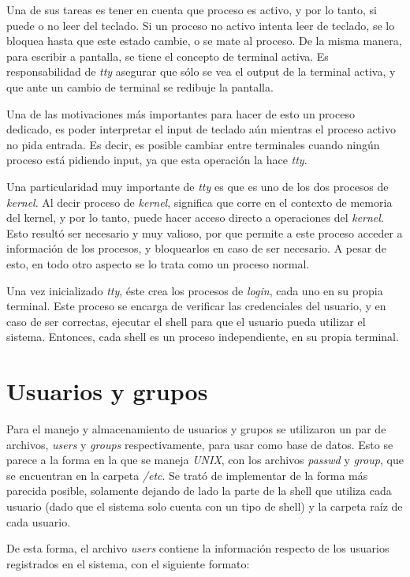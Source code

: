 \documentclass[a4paper,10pt]{article}
\begin{document}
Una de sus tareas es tener en cuenta que proceso es activo, y por lo tanto, si puede o no leer del teclado.
Si un proceso no activo intenta leer de teclado, se lo bloquea hasta que este estado cambie, o se mate al proceso.
De la misma manera, para escribir a pantalla, se tiene el concepto de terminal activa.
Es responsabilidad de \textit{tty} asegurar que sólo se vea el output de la terminal activa, y que ante un cambio de terminal se redibuje la pantalla.

Una de las motivaciones más importantes para hacer de esto un proceso dedicado, es poder interpretar el input de teclado aún mientras el proceso activo no pida entrada.
Es decir, es posible cambiar entre terminales cuando ningún proceso está pidiendo input, ya que esta operación la hace \textit{tty}.

Una particularidad muy importante de \textit{tty} es que es uno de los dos procesos de \textit{kernel}.
Al decir proceso de \textit{kernel}, significa que corre en el contexto de memoria del kernel, y por lo tanto, puede hacer acceso directo a operaciones del \textit{kernel}.
Esto resultó ser necesario y muy valioso, por que permite a este proceso acceder a información de los procesos, y bloquearlos en caso de ser necesario.
A pesar de esto, en todo otro aspecto se lo trata como un proceso normal.

Una vez inicializado \textit{tty}, éste crea los procesos de \textit{login}, cada uno en su propia terminal.
Este proceso se encarga de verificar las credenciales del usuario, y en caso de ser correctas, ejecutar el shell para que el usuario pueda utilizar el sistema.
Entonces, cada shell es un proceso independiente, en su propia terminal.

\newpage
\section{Usuarios y grupos}
Para el manejo y almacenamiento de usuarios y grupos se utilizaron un par de archivos, \textit{users} y \textit{groups} respectivamente, para usar como 
base de datos. Esto se parece a la forma en la que se maneja \textit{UNIX}, con los archivos \textit{passwd} y \textit{group}, que se encuentran en la carpeta
\textit{/etc}. Se trató de implementar de la forma más parecida posible, solamente dejando de lado la parte de la shell que utiliza cada usuario (dado que el sistema
solo cuenta con un tipo de shell) y la carpeta raíz de cada usuario.

De esta forma, el archivo \textit{users} contiene la información respecto de los usuarios registrados en el sistema, con el siguiente formato:
\end{document}
